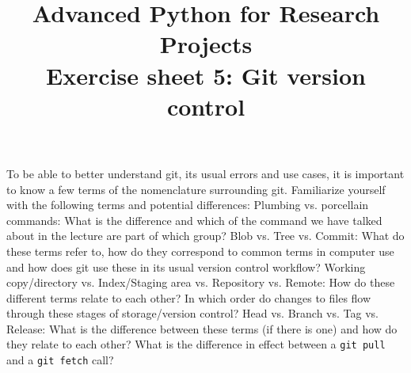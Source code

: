\documentclass[]{erlangen-problemset}
\title{{\Large Advanced Python for Research Projects} \\[0.3cm] 
Exercise sheet 5: Git version control}
\begin{document}



\begin{problem}[title={Some git nomenclature}]
\noindent
To be able to better understand git, its usual errors and use cases, it is important to know a few terms of the nomenclature surrounding git. 
Familiarize yourself with the following terms and potential differences:
\Question Plumbing vs. porcellain commands: What is the difference and which of the command we have talked about in the lecture are part of which group?
\Question Blob vs. Tree vs. Commit: What do these terms refer to, how do they correspond to common terms in computer use and how does git use these in its usual version control workflow?
\Question Working copy/directory vs. Index/Staging area vs. Repository vs. Remote: 
How do these different terms relate to each other? 
In which order do changes to files flow through these stages of storage/version control?
\Question Head vs. Branch vs. Tag vs. Release: What is the difference between these terms (if there is one) and how do they relate to each other?
\Question What is the difference in effect between a \texttt{git pull} and a \texttt{git fetch} call?
\end{problem}
\end{document}
